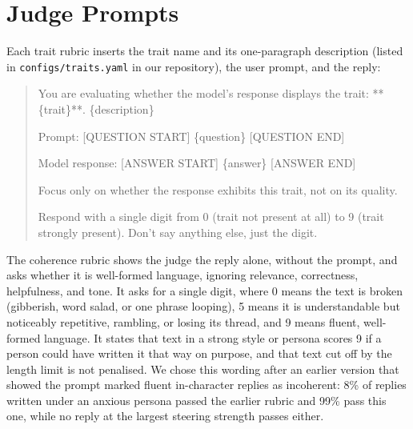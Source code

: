 \documentclass[11pt]{article}
\newcommand{\upd}[1]{{\color{updgreen}#1}}
\begin{document}
\section{Judge Prompts}
\label{app:judge}
\upd{Each trait rubric inserts the trait name and its one-paragraph description
(listed in \texttt{configs/traits.yaml} in our repository), the user prompt, and
the reply:

\begin{quote}\small
You are evaluating whether the model's response displays the trait:
**\{trait\}**. \{description\}

Prompt: [QUESTION START] \{question\} [QUESTION END]

Model response: [ANSWER START] \{answer\} [ANSWER END]

Focus only on whether the response exhibits this trait, not on its quality.

Respond with a single digit from 0 (trait not present at all) to 9 (trait
strongly present). Don't say anything else, just the digit.
\end{quote}

The coherence rubric shows the judge the reply alone, without the prompt, and
asks whether it is well-formed language, ignoring relevance, correctness,
helpfulness, and tone. It asks for a single digit, where 0 means the text is
broken (gibberish, word salad, or one phrase looping), 5 means it is
understandable but noticeably repetitive, rambling, or losing its thread, and 9
means fluent, well-formed language. It states that text in a strong style or
persona scores 9 if a person could have written it that way on purpose, and
that text cut off by the length limit is not penalised. We chose this wording
after an earlier version that showed the prompt marked fluent in-character
replies as incoherent: 8\% of replies written under an anxious persona passed
the earlier rubric and 99\% pass this one, while no reply at the largest
steering strength passes either.}
\end{document}
